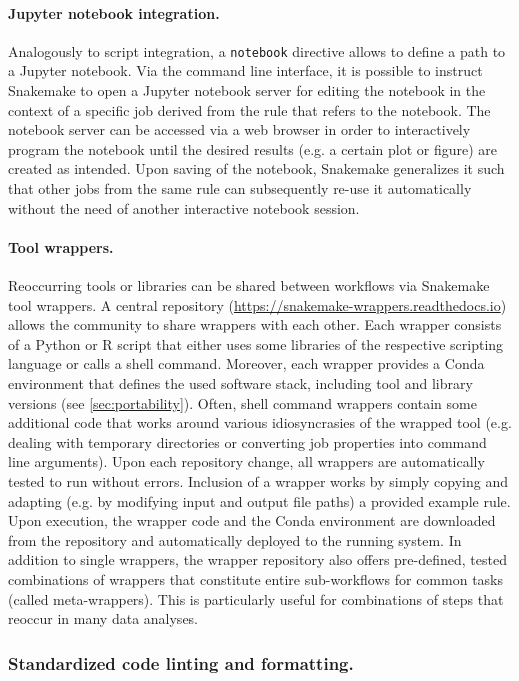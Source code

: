 \documentclass[parskip=half]{scrartcl}
\let\plainurl\url
\renewcommand{\url}[1]{\protect\plainurl{#1}}
\begin{document}
\paragraph{Jupyter notebook integration.}
Analogously to script integration, a \lstinline!notebook! directive allows to define a path to a Jupyter notebook.
Via the command line interface, it is possible to instruct Snakemake to open a Jupyter notebook server for editing the notebook in the context of a specific job derived from the rule that refers to the notebook.
The notebook server can be accessed via a web browser in order to interactively program the notebook until the desired results (e.g. a certain plot or figure) are created as intended.
Upon saving of the notebook, Snakemake generalizes it such that other jobs from the same rule can subsequently re-use it automatically without the need of another interactive notebook session.

\paragraph{Tool wrappers.}
Reoccurring tools or libraries can be shared between workflows via Snakemake tool wrappers.
A central repository (\url{https://snakemake-wrappers.readthedocs.io}) allows the community to share wrappers with each other.
Each wrapper consists of a Python or R script that either uses some libraries of the respective scripting language or calls a shell command.
Moreover, each wrapper provides a Conda environment that defines the used software stack, including tool and library versions (see \autoref{sec:portability}).
Often, shell command wrappers contain some additional code that works around various idiosyncrasies of the wrapped tool (e.g. dealing with temporary directories or converting job properties into command line arguments).
Upon each repository change, all wrappers are automatically tested to run without errors.
Inclusion of a wrapper works by simply copying and adapting (e.g. by modifying input and output file paths) a provided example rule.
Upon execution, the wrapper code and the Conda environment are downloaded from the repository and automatically deployed to the running system.
In addition to single wrappers, the wrapper repository also offers pre-defined, tested combinations of wrappers that constitute entire sub-workflows for common tasks (called meta-wrappers).
This is particularly useful for combinations of steps that reoccur in many data analyses.

\subsubsection{Standardized code linting and formatting.}\label{sec:style}
\end{document}

